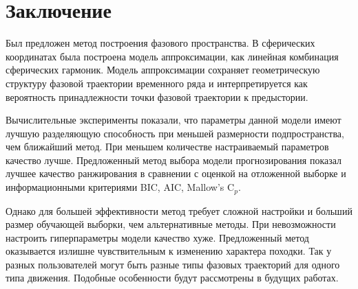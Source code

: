 \documentclass[article,14pt,subf,href,colorlinks=true
]{disser}
\begin{document}
\newpage
\section*{Заключение}
Был предложен метод построения фазового пространства.
В сферических координатах была построена модель аппроксимации, как линейная комбинация сферических гармоник.
Модель аппроксимации сохраняет геометрическую структуру фазовой траектории временного ряда и интерпретируется как вероятность принадлежности точки фазовой траектории к предыстории.

Вычислительные эксперименты показали, что параметры данной модели имеют лучшую разделяющую способность при меньшей размерности подпространства, чем ближайший метод.
При меньшем количестве настраиваемый параметров качество лучше.
Предложенный метод выбора модели прогнозирования показал лучшее качество ранжирования в сравнении с оценкой на отложенной выборке и информационными критериями BIC, AIC, Mallow's $\text{C}_p$.

Однако для большей эффективности метод требует сложной настройки и больший размер обучающей выборки, чем альтернативные методы.
При невозможности настроить гиперпараметры модели качество хуже.
Предложенный метод оказывается излишне чувствительным к изменению характера походки. 
Так у разных пользователей могут быть разные типы фазовых траекторий для одного типа движения.
Подобные особенности будут рассмотрены в будущих работах.
\newpage


\end{document}
